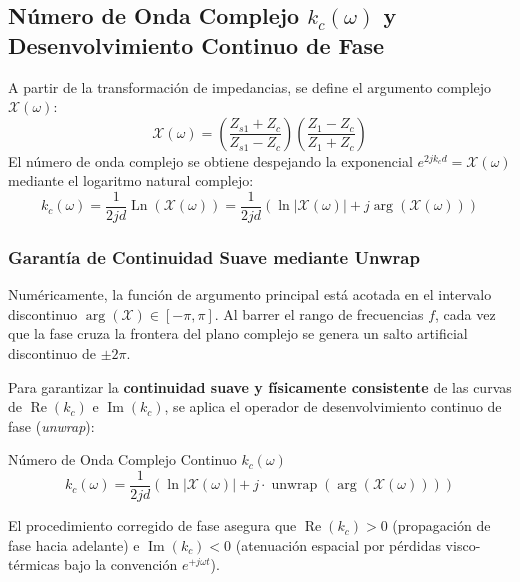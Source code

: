 \documentclass[11pt,a4paper]{article}
\begin{document}
\subsection{\texorpdfstring{Número de Onda Complejo $k_c(\omega)$ y Desenvolvimiento Continuo de Fase}{Número de Onda Complejo k\_c(omega) y Desenvolvimiento Continuo de Fase}}
A partir de la transformación de impedancias, se define el argumento complejo $\mathcal{X}(\omega)$:
\begin{equation}
\mathcal{X}(\omega) = \left( \frac{Z_{s1} + Z_c}{Z_{s1} - Z_c} \right) \left( \frac{Z_1 - Z_c}{Z_1 + Z_c} \right)
\end{equation}
El número de onda complejo se obtiene despejando la exponencial $e^{2 j k_c d} = \mathcal{X}(\omega)$ mediante el logaritmo natural complejo:
\begin{equation}
k_c(\omega) = \frac{1}{2 j d} \operatorname{Ln}\left( \mathcal{X}(\omega) \right) = \frac{1}{2 j d} \left( \ln |\mathcal{X}(\omega)| + j \arg(\mathcal{X}(\omega)) \right)
\end{equation}

\subsubsection{Garantía de Continuidad Suave mediante Unwrap}
Numéricamente, la función de argumento principal está acotada en el intervalo discontinuo $\arg(\mathcal{X}) \in [-\pi, \pi]$. Al barrer el rango de frecuencias $f$, cada vez que la fase cruza la frontera del plano complejo se genera un salto artificial discontinuo de $\pm 2\pi$.

Para garantizar la \textbf{continuidad suave y físicamente consistente} de las curvas de $\operatorname{Re}(k_c)$ e $\operatorname{Im}(k_c)$, se aplica el operador de desenvolvimiento continuo de fase (\textit{unwrap}):
\begin{infobox}{\texorpdfstring{Número de Onda Complejo Continuo $k_c(\omega)$ \citep{utsuno1989}}{Número de Onda Complejo Continuo k\_c(omega)}}
\begin{equation}
k_c(\omega) = \frac{1}{2 j d} \left( \ln |\mathcal{X}(\omega)| + j \cdot \operatorname{unwrap}\left( \arg(\mathcal{X}(\omega)) \right) \right)
\end{equation}
\end{infobox}
El procedimiento corregido de fase asegura que $\operatorname{Re}(k_c) > 0$ (propagación de fase hacia adelante) e $\operatorname{Im}(k_c) < 0$ (atenuación espacial por pérdidas visco-térmicas bajo la convención $e^{+j\omega t}$).
\end{document}
